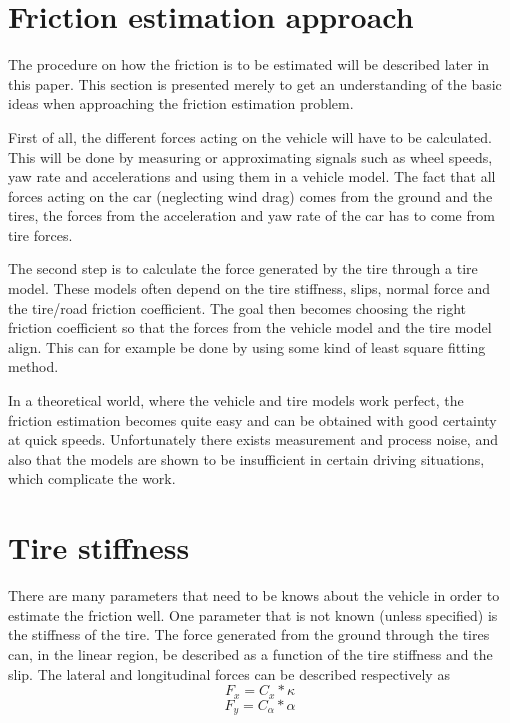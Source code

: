 \section{Friction estimation approach}

The procedure on how the friction is to be estimated will be described later in this paper. This section is presented merely to get an understanding of the basic ideas when approaching the friction estimation problem.

First of all, the different forces acting on the vehicle will have to be calculated. This will be done by measuring or approximating signals such as wheel speeds, yaw rate and accelerations and using them in a vehicle model. The fact that all forces acting on the car (neglecting wind drag) comes from the ground and the tires, the forces from the acceleration and yaw rate of the car has to come from tire forces. 

The second step is to calculate the force generated by the tire through a tire model. These models often depend on the tire stiffness, slips, normal force and the tire/road friction coefficient. The goal then becomes choosing the right friction coefficient so that the forces from the vehicle model and the tire model align. This can for example be done by using some kind of least square fitting method. 

In a theoretical world, where the vehicle and tire models work perfect, the friction estimation becomes quite easy and can be obtained with good certainty at quick speeds. Unfortunately there exists measurement and process noise, and also that the models are shown to be insufficient in certain driving situations, which complicate the work.

\section{Tire stiffness}

There are many parameters that need to be knows about the vehicle in order to estimate the friction well. One parameter that is not known (unless specified) is the stiffness of the tire. The force generated from the ground through the tires can, in the linear region, be described as a function of the tire stiffness and the slip. The lateral and longitudinal forces can be described respectively as
\begin{equation}
	F_{x} = C_{x}*\kappa
\end{equation}
\begin{equation}
	F_{y} = C_{\alpha}*\alpha
\end{equation}

